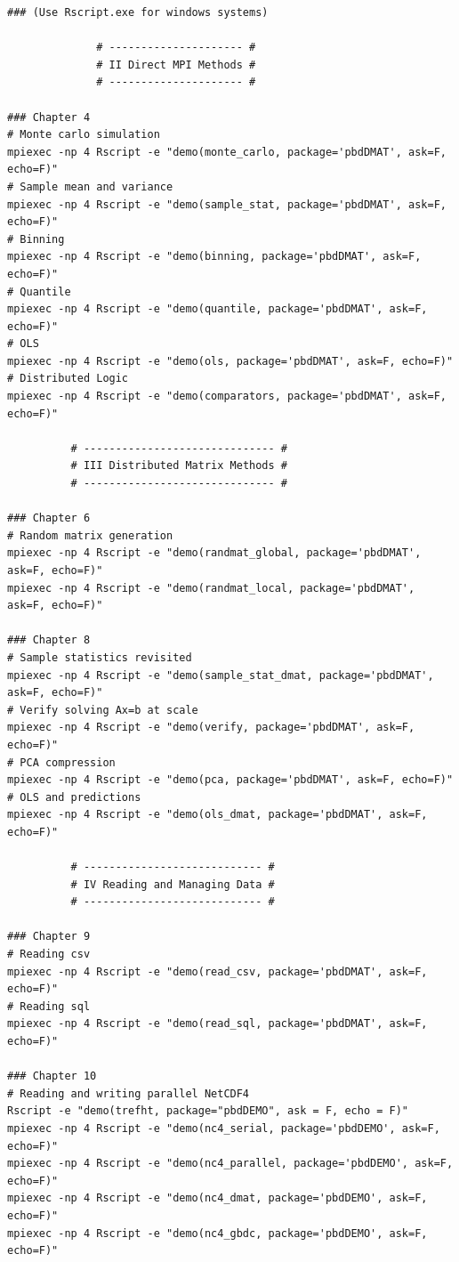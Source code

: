 \begin{lstlisting}[title=List of Demos]
### (Use Rscript.exe for windows systems)

		      # --------------------- #
		      # II Direct MPI Methods #
		      # --------------------- #

### Chapter 4
# Monte carlo simulation
mpiexec -np 4 Rscript -e "demo(monte_carlo, package='pbdDMAT', ask=F, echo=F)"
# Sample mean and variance
mpiexec -np 4 Rscript -e "demo(sample_stat, package='pbdDMAT', ask=F, echo=F)"
# Binning
mpiexec -np 4 Rscript -e "demo(binning, package='pbdDMAT', ask=F, echo=F)"
# Quantile
mpiexec -np 4 Rscript -e "demo(quantile, package='pbdDMAT', ask=F, echo=F)"
# OLS
mpiexec -np 4 Rscript -e "demo(ols, package='pbdDMAT', ask=F, echo=F)"
# Distributed Logic
mpiexec -np 4 Rscript -e "demo(comparators, package='pbdDMAT', ask=F, echo=F)"

		  # ------------------------------ #
		  # III Distributed Matrix Methods #
		  # ------------------------------ #

### Chapter 6
# Random matrix generation
mpiexec -np 4 Rscript -e "demo(randmat_global, package='pbdDMAT', ask=F, echo=F)"
mpiexec -np 4 Rscript -e "demo(randmat_local, package='pbdDMAT', ask=F, echo=F)"

### Chapter 8
# Sample statistics revisited
mpiexec -np 4 Rscript -e "demo(sample_stat_dmat, package='pbdDMAT', ask=F, echo=F)"
# Verify solving Ax=b at scale
mpiexec -np 4 Rscript -e "demo(verify, package='pbdDMAT', ask=F, echo=F)"
# PCA compression
mpiexec -np 4 Rscript -e "demo(pca, package='pbdDMAT', ask=F, echo=F)"
# OLS and predictions
mpiexec -np 4 Rscript -e "demo(ols_dmat, package='pbdDMAT', ask=F, echo=F)"

		  # ---------------------------- #
		  # IV Reading and Managing Data #
		  # ---------------------------- #

### Chapter 9
# Reading csv
mpiexec -np 4 Rscript -e "demo(read_csv, package='pbdDMAT', ask=F, echo=F)"
# Reading sql
mpiexec -np 4 Rscript -e "demo(read_sql, package='pbdDMAT', ask=F, echo=F)"

### Chapter 10
# Reading and writing parallel NetCDF4
Rscript -e "demo(trefht, package="pbdDEMO", ask = F, echo = F)"
mpiexec -np 4 Rscript -e "demo(nc4_serial, package='pbdDEMO', ask=F, echo=F)"
mpiexec -np 4 Rscript -e "demo(nc4_parallel, package='pbdDEMO', ask=F, echo=F)"
mpiexec -np 4 Rscript -e "demo(nc4_dmat, package='pbdDEMO', ask=F, echo=F)"
mpiexec -np 4 Rscript -e "demo(nc4_gbdc, package='pbdDEMO', ask=F, echo=F)"


\end{lstlisting}
